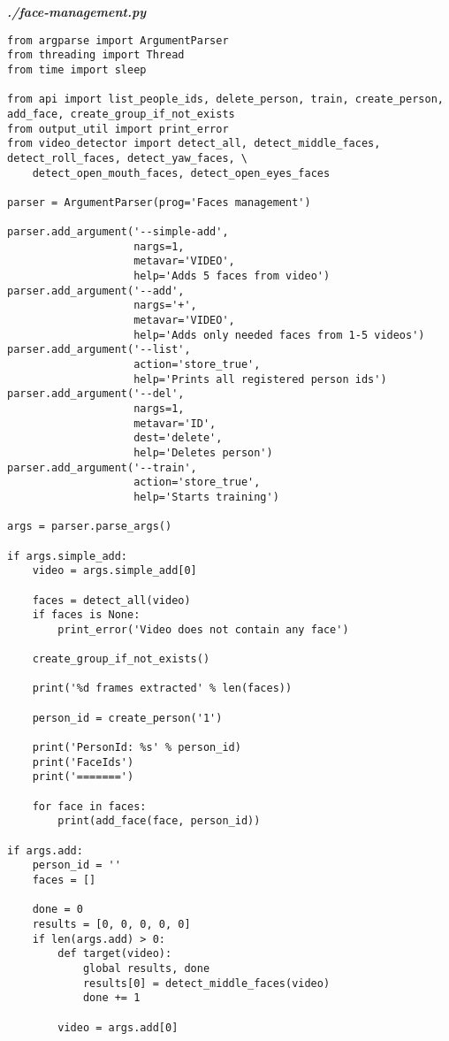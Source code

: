 \textit{\textbf{./face-management.py}}
\begin{verbatim}
from argparse import ArgumentParser
from threading import Thread
from time import sleep

from api import list_people_ids, delete_person, train, create_person, add_face, create_group_if_not_exists
from output_util import print_error
from video_detector import detect_all, detect_middle_faces, detect_roll_faces, detect_yaw_faces, \
    detect_open_mouth_faces, detect_open_eyes_faces

parser = ArgumentParser(prog='Faces management')

parser.add_argument('--simple-add',
                    nargs=1,
                    metavar='VIDEO',
                    help='Adds 5 faces from video')
parser.add_argument('--add',
                    nargs='+',
                    metavar='VIDEO',
                    help='Adds only needed faces from 1-5 videos')
parser.add_argument('--list',
                    action='store_true',
                    help='Prints all registered person ids')
parser.add_argument('--del',
                    nargs=1,
                    metavar='ID',
                    dest='delete',
                    help='Deletes person')
parser.add_argument('--train',
                    action='store_true',
                    help='Starts training')

args = parser.parse_args()

if args.simple_add:
    video = args.simple_add[0]

    faces = detect_all(video)
    if faces is None:
        print_error('Video does not contain any face')

    create_group_if_not_exists()

    print('%d frames extracted' % len(faces))

    person_id = create_person('1')

    print('PersonId: %s' % person_id)
    print('FaceIds')
    print('=======')

    for face in faces:
        print(add_face(face, person_id))

if args.add:
    person_id = ''
    faces = []

    done = 0
    results = [0, 0, 0, 0, 0]
    if len(args.add) > 0:
        def target(video):
            global results, done
            results[0] = detect_middle_faces(video)
            done += 1

        video = args.add[0]


\end{verbatim}
